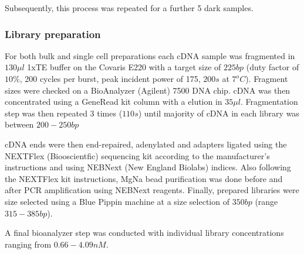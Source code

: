 Subsequently, this process was repeated for a further 5 dark samples.


\subsubsection{Library preparation}

For both bulk and single cell preparations each cDNA sample was fragmented in \(130\mu l\) 1xTE buffer on the Covaris E220 
with a target size of \(225bp\) (duty factor of \(10\%\), 200 cycles per burst, peak incident power
of 175, \(200s\) at \(7^{o}C\)). Fragment sizes were checked on a BioAnalyzer (Agilent) 7500 DNA chip.
cDNA was then concentrated using a GeneRead kit column with a elution in \(35\mu l\). Fragmentation
step was then repeated 3 times (\(110s\)) until majority of cDNA in each library was between \(200-250bp\)

cDNA ends were then end-repaired, adenylated and adapters ligated using the NEXTFlex (Biooscientfic) sequencing kit 
according to the manufacturer's instructions and using NEBNext (New England Biolabs) indices.  Also following
the NEXTFlex kit instructions, MgNa bead purification was done before and after PCR amplification using
NEBNext reagents.  Finally, prepared libraries were size selected using a Blue Pippin machine at a size selection
of \(350bp\) (range \(315-385bp\)).

A final bioanalyzer step was conducted with individual library concentrations ranging from \(0.66-4.09nM\).

